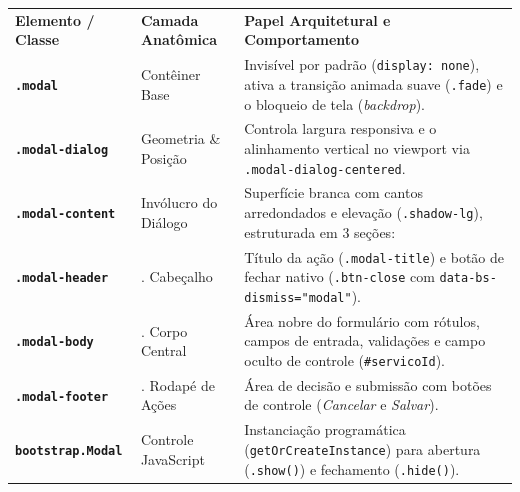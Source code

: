 \noindent
\begin{tcolorbox}[
    enhanced,
    colback=white,
    colframe=azulTitulo!60,
    arc=4pt,
    boxrule=0.8pt,
    top=0pt, bottom=0pt, left=0pt, right=0pt,
    shadow={1mm}{-1mm}{0mm}{black!8}
]
\small
\renewcommand{\arraystretch}{1.12}
\begin{tabularx}{\linewidth}{>{\raggedright\arraybackslash}p{3.2cm} >{\raggedright\arraybackslash}p{2.5cm} >{\raggedright\arraybackslash}X}
\rowcolor{azulTitulo}
\textbf{\color{white}\footnotesize Elemento / Classe} & 
\textbf{\color{white}\footnotesize Camada Anatômica} & 
\textbf{\color{white}\footnotesize Papel Arquitetural e Comportamento} \\
\rowcolor{white}
\colorbox{azulTitulo!8}{\textbf{\texttt{.modal}}} & 
Contêiner Base & 
Invisível por padrão (\texttt{display: none}), ativa a transição animada suave (\texttt{.fade}) e o bloqueio de tela (\textit{backdrop}). \\
\hline
\rowcolor{cinzaFundo}
\colorbox{azulTitulo!8}{\textbf{\texttt{.modal-dialog}}} & 
Geometria \& Posição & 
Controla largura responsiva e o alinhamento vertical no viewport via \texttt{.modal-dialog-centered}. \\
\hline
\rowcolor{white}
\colorbox{azulTitulo!8}{\textbf{\texttt{.modal-content}}} & 
Invólucro do Diálogo & 
Superfície branca com cantos arredondados e elevação (\texttt{.shadow-lg}), estruturada em 3 seções: \\
\hline
\rowcolor{cinzaFundo}
\hspace*{4pt}\colorbox{azulTitulo!12}{\textbf{\texttt{.modal-header}}} & 
1. Cabeçalho & 
Título da ação (\texttt{.modal-title}) e botão de fechar nativo (\texttt{.btn-close} com \texttt{data-bs-dismiss="modal"}). \\
\hline
\rowcolor{white}
\hspace*{4pt}\colorbox{azulTitulo!12}{\textbf{\texttt{.modal-body}}} & 
2. Corpo Central & 
Área nobre do formulário com rótulos, campos de entrada, validações e campo oculto de controle (\texttt{\#servicoId}). \\
\hline
\rowcolor{cinzaFundo}
\hspace*{4pt}\colorbox{azulTitulo!12}{\textbf{\texttt{.modal-footer}}} & 
3. Rodapé de Ações & 
Área de decisão e submissão com botões de controle (\textit{Cancelar} e \textit{Salvar}). \\
\hline
\rowcolor{white}
\colorbox{azulTitulo!8}{\textbf{\texttt{bootstrap.Modal}}} & 
Controle JavaScript & 
Instanciação programática (\texttt{getOrCreateInstance}) para abertura (\texttt{.show()}) e fechamento (\texttt{.hide()}).
\end{tabularx}
\end{tcolorbox}

